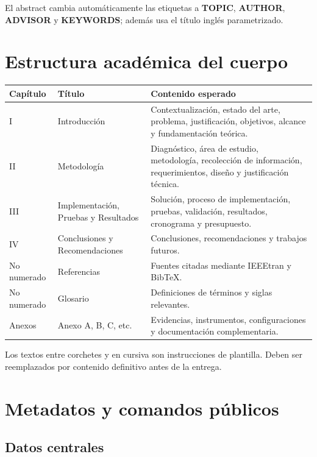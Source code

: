 \documentclass[12pt,a4paper,oneside]{report}
\begin{document}
El abstract cambia automáticamente las etiquetas a \textbf{TOPIC}, \textbf{AUTHOR}, \textbf{ADVISOR} y \textbf{KEYWORDS}; además usa el título inglés parametrizado.

\chapter{Estructura académica del cuerpo}

\begin{longtable}{|p{3cm}|p{4.2cm}|p{5.4cm}|}
  \hline
  \textbf{Capítulo} & \textbf{Título} & \textbf{Contenido esperado} \\
  \hline
  I & Introducción & Contextualización, estado del arte, problema, justificación, objetivos, alcance y fundamentación teórica. \\
  \hline
  II & Metodología & Diagnóstico, área de estudio, metodología, recolección de información, requerimientos, diseño y justificación técnica. \\
  \hline
  III & Implementación, Pruebas y Resultados & Solución, proceso de implementación, pruebas, validación, resultados, cronograma y presupuesto. \\
  \hline
  IV & Conclusiones y Recomendaciones & Conclusiones, recomendaciones y trabajos futuros. \\
  \hline
  No numerado & Referencias & Fuentes citadas mediante IEEEtran y BibTeX. \\
  \hline
  No numerado & Glosario & Definiciones de términos y siglas relevantes. \\
  \hline
  Anexos & Anexo A, B, C, etc. & Evidencias, instrumentos, configuraciones y documentación complementaria. \\
  \hline
\end{longtable}

Los textos entre corchetes y en cursiva son instrucciones de plantilla. Deben ser reemplazados por contenido definitivo antes de la entrega.

\chapter{Metadatos y comandos públicos}

\section{Datos centrales}
\end{document}
